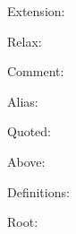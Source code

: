 \documentclass{article}
\let\primext\primglossary \let\primglossary\relax
\let\primrelax\primglossary \let\primglossary\relax
\let\primcomment\primglossary \let\primglossary\relax
\let\primalias\primglossary
\begin{document}
Extension: \primext\par
Relax: \primrelax\par
Comment: \primcomment\par
Alias: \primalias\par
Quoted: \primquoted\par
Above: \primabove\par
Definitions: \primdefs\par
Root: \provdefs
\end{document}
